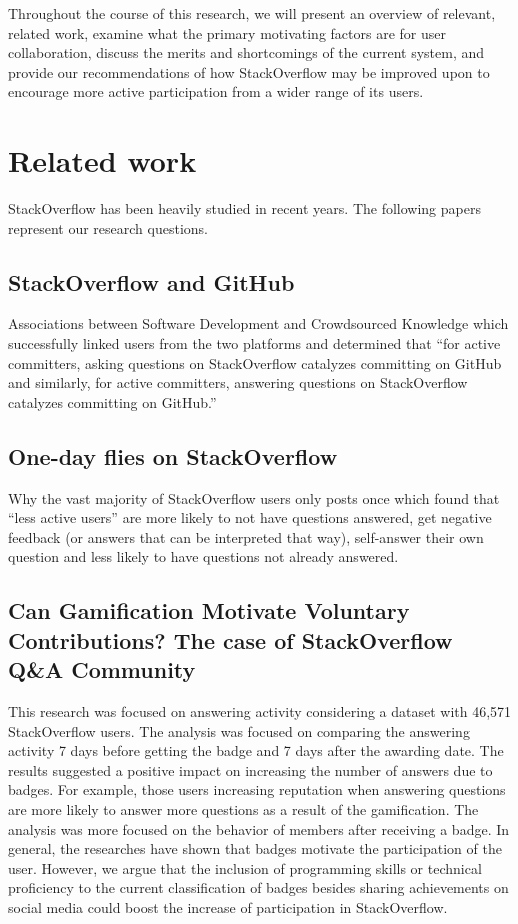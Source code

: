 \documentclass{sigchi}
\begin{document}
Throughout the course of this research, we will present an overview of relevant, related work, examine what the primary motivating factors are for user collaboration, discuss the merits and shortcomings of the current system, and provide our recommendations of how StackOverflow may be improved upon to encourage more active participation from a wider range of its users. 

\section{Related work}
StackOverflow has been heavily studied in recent years. The following papers represent our research questions.

\subsection{StackOverflow and GitHub}

Associations between Software Development and Crowdsourced Knowledge which
successfully linked users from the two platforms and determined that “for
active committers, asking questions on StackOverflow catalyzes committing on
GitHub and similarly, for active committers, answering questions on
StackOverflow catalyzes committing on GitHub.”

\subsection{One-day flies on StackOverflow}

Why the vast majority of StackOverflow users only posts once which found that
“less active users” are more likely to not have questions answered, get
negative feedback (or answers that can be interpreted that way), self-answer
their own question and less likely to have questions not already answered.

\subsection{Can Gamification Motivate Voluntary Contributions? The case of
StackOverflow Q\&A Community}

This research was focused on answering activity considering a dataset with 46,571 StackOverflow users. The analysis was focused on comparing the answering activity 7 days before getting the badge and 7 days after the awarding date. The results suggested a positive impact on increasing the number of answers due to badges. For example, those users increasing reputation when answering questions are more likely to answer more questions as a result of the gamification. The analysis was more focused on the behavior of members after receiving a badge. In general, the researches have shown that badges motivate the participation of the user. However, we argue that the inclusion of programming skills or technical proficiency to the current classification of badges besides sharing achievements on social media could boost the increase of participation in StackOverflow.
\end{document}

